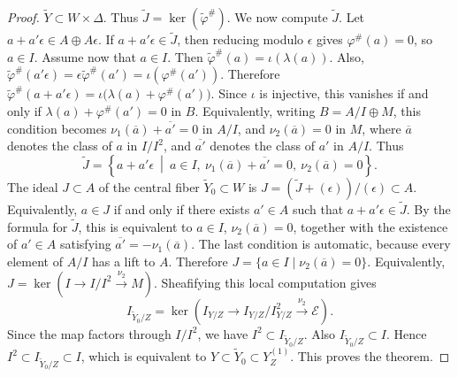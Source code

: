 \documentclass[11pt,twoside]{amsart}
\theoremstyle{plain}
\numberwithin{equation}{section}
\theoremstyle{definition}
\begin{document}
\begin{proof}
\(\widetilde Y\subset W\times\Delta\). Thus \(\widetilde J=\ker(\widetilde\varphi^\#)\). We now compute \(\widetilde J\). Let \(a+a'\epsilon\in A\oplus A\epsilon\). If \(a+a'\epsilon\in\widetilde J\), then reducing modulo \(\epsilon\) gives \(\varphi^\#(a)=0\), so \(a\in I\). Assume now that \(a\in I\). Then \(\widetilde\varphi^\#(a)=\iota(\lambda(a))\). Also,
\(\widetilde\varphi^\#(a'\epsilon)=\epsilon\widetilde\varphi^\#(a')=\iota(\varphi^\#(a'))\). Therefore \(\widetilde\varphi^\#(a+a'\epsilon)=\iota\bigl(\lambda(a)+\varphi^\#(a')\bigr)\). Since \(\iota\) is injective, this vanishes if and only if \(\lambda(a)+\varphi^\#(a')=0\) in \(B\).
Equivalently, writing \(B=A/I\oplus M\), this condition becomes
\(\nu_1(\overline a)+\overline{a'}=0\) in \(A/I\), and \(\nu_2(\overline a)=0\) in \(M\), where \(\overline a\) denotes the class of \(a\) in \(I/I^2\), and
\(\overline{a'}\) denotes the class of \(a'\) in \(A/I\). Thus
\[
    \widetilde J
    =
    \left\{
        a+a'\epsilon
        \ \middle|\
        a\in I,\ 
        \nu_1(\overline a)+\overline{a'}=0,\ 
        \nu_2(\overline a)=0
    \right\}.
\]
The ideal \(J\subset A\) of the central fiber \(\widetilde Y_0\subset W\) is
\(J=(\widetilde J+(\epsilon))/(\epsilon)\subset A\).
Equivalently, \(a\in J\) if and only if there exists \(a'\in A\) such that
\(a+a'\epsilon\in \widetilde J\). By the formula for \(\widetilde J\), this is equivalent to \(a\in I\), \(\nu_2(\overline a)=0\),
together with the existence of \(a'\in A\) satisfying \(\overline{a'}=-\nu_1(\overline a)\). The last condition is automatic, because every element of \(A/I\) has a lift to \(A\). Therefore \(J=\{a\in I\mid \nu_2(\overline a)=0\}\). Equivalently, \(J=\ker\left(I\to I/I^2\xrightarrow{\nu_2}M\right)\). Sheafifying this local computation gives
\[
    I_{\widetilde Y_0/Z}
    =
    \ker\left(
        I_{Y/Z}
        \longrightarrow
        I_{Y/Z}/I_{Y/Z}^2
        \xrightarrow{\nu_2}
        \mathcal E
    \right).
\]
Since the map factors through \(I/I^2\), we have \(I^2\subset I_{\widetilde Y_0/Z}\). Also \(I_{\widetilde Y_0/Z}\subset I\). Hence \(I^2\subset I_{\widetilde Y_0/Z}\subset I\), which is equivalent to \(Y\subset \widetilde Y_0\subset Y^{(1)}_Z\). This proves the theorem.
\end{proof}
\end{document}
